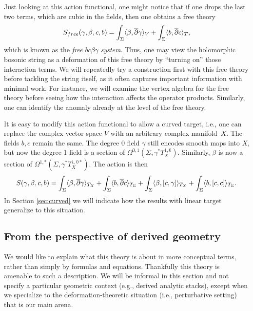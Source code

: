 \begin{rmk}
\label{rmk:bcbg}
Just looking at this action functional, one might notice that if one drops the last two terms,
which are cubic in the fields, then one obtains a free theory
\begin{equation}
S_{free}(\gamma,\beta,c,b) = 
\int_\Sigma \langle \beta, \overline{\partial} \gamma \rangle_V 
+ \int_\Sigma \langle b, \overline{\partial} c \rangle_T,
\end{equation}
which is known as the {\em free $bc\beta\gamma$ system}.
Thus, one may view the holomorphic bosonic string as a deformation of this free theory
by ``turning on'' those interaction terms.
We will repeatedly try a construction first with this free theory before tackling the string itself,
as it often captures important information with minimal work.
For instance, we will examine the vertex algebra for the free theory before seeing how the interaction affects the operator products.
Similarly, one can identify the anomaly already at the level of the free theory.
\end{rmk}

\begin{rmk}
\label{rmk:curved}
It is easy to modify this action functional to allow a curved target,
i.e., one can replace the complex vector space $V$ with an arbitrary complex manifold~$X$. 
The fields $b,c$ remain the same.
The degree 0 field $\gamma$ still encodes smooth maps into $X$, but now the degree 1 field is a section of $\Omega^{0,1}(\Sigma, \gamma^*T^{1,0}_X)$.
Similarly, $\beta$ is now a section of $\Omega^{1,*}(\Sigma, \gamma^*T^{1,0*}_X)$.
The action is then
\begin{equation}\label{curved action}
S(\gamma,\beta,c,b) = 
\int_\Sigma \langle \beta, \overline{\partial} \gamma \rangle_{T_X}
+ \int_\Sigma \langle b, \overline{\partial} c \rangle_{T_\Sigma} 
+ \int_\Sigma \langle \beta, [c,\gamma] \rangle_{T_X}
+ \int_\Sigma \langle b, [c,c] \rangle_{T_\Sigma}.
\end{equation}
In Section \ref{sec:curved} we will indicate how the results with linear target generalize to this situation.
\end{rmk}

\subsection{From the perspective of derived geometry}

We would like to explain what this theory is about in more conceptual terms,
rather than simply by formulas and equations.
Thankfully this theory is amenable to such a description.
We will be informal in this section and not specify a particular geometric context (e.g., derived analytic stacks),
except when we specialize to the deformation-theoretic situation (i.e., perturbative setting) that is our main arena.

